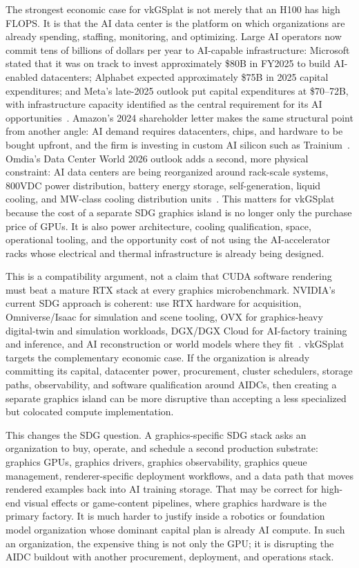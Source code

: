 \documentclass[10pt,journal,onecolumn]{IEEEtran}
\begin{document}
The strongest economic case for vkGSplat is not merely that an H100 has high
FLOPS. It is that the AI data center is the platform on which organizations are
already spending, staffing, monitoring, and optimizing. Large AI operators now
commit tens of billions of dollars per year to AI-capable infrastructure:
Microsoft stated that it was on track to invest approximately \$80B in FY2025 to
build AI-enabled datacenters; Alphabet expected approximately \$75B in 2025
capital expenditures; and Meta's late-2025 outlook put capital expenditures at
\$70--72B, with infrastructure capacity identified as the central requirement
for its AI opportunities~\cite{microsoft-ai-datacenter-2025,alphabet-q4-2024-capex,meta-q3-2025-capex}.
Amazon's 2024 shareholder letter makes the same structural point from another
angle: AI demand requires datacenters, chips, and hardware to be bought upfront,
and the firm is investing in custom AI silicon such as
Trainium~\cite{amazon-shareholder-letter-2024}.
Omdia's Data Center World 2026 outlook adds a second, more physical constraint:
AI data centers are being reorganized around rack-scale systems, 800VDC power
distribution, battery energy storage, self-generation, liquid cooling, and
MW-class cooling distribution units~\cite{omdia-dcw-oas-2026}. This matters for
vkGSplat because the cost of a separate SDG graphics island is no longer only
the purchase price of GPUs. It is also power architecture, cooling qualification,
space, operational tooling, and the opportunity cost of not using the
AI-accelerator racks whose electrical and thermal infrastructure is already
being designed.

This is a compatibility argument, not a claim that CUDA software rendering must
beat a mature RTX stack at every graphics microbenchmark. NVIDIA's current SDG
approach is coherent: use RTX hardware for acquisition, Omniverse/Isaac for
simulation and scene tooling, OVX for graphics-heavy digital-twin and
simulation workloads, DGX/DGX Cloud for AI-factory training and inference, and
AI reconstruction or world models where they fit~\cite{nvidia-ovx,nvidia-dgx-cloud}.
vkGSplat targets the complementary economic case. If the organization is
already committing its capital, datacenter power, procurement, cluster
schedulers, storage paths, observability, and software qualification around
AIDCs, then creating a separate graphics island can be more disruptive than
accepting a less specialized but colocated compute implementation.

This changes the SDG question. A graphics-specific SDG stack asks an
organization to buy, operate, and schedule a second production substrate:
graphics GPUs, graphics drivers, graphics observability, graphics queue
management, renderer-specific deployment workflows, and a data path that moves
rendered examples back into AI training storage. That may be correct for
high-end visual effects or game-content pipelines, where graphics hardware is
the primary factory. It is much harder to justify inside a robotics or foundation
model organization whose dominant capital plan is already AI compute. In such
an organization, the expensive thing is not only the GPU; it is disrupting the
AIDC buildout with another procurement, deployment, and operations stack.
\end{document}
